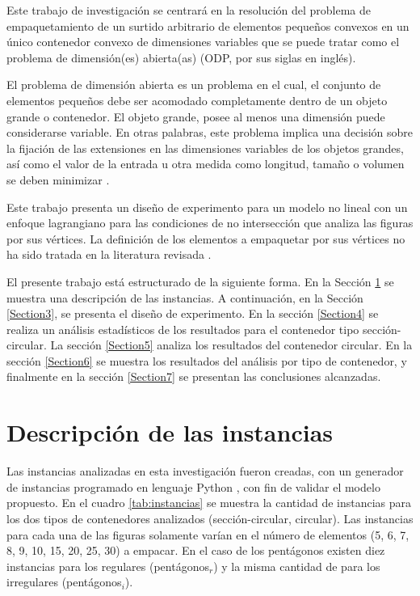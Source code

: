 \documentclass[5p,times]{elsarticle}
\begin{document}
   Este trabajo de investigación se centrará en la resolución del problema de empaquetamiento de un surtido arbitrario de elementos pequeños convexos en un único contenedor convexo de dimensiones variables que se puede tratar como el problema de dimensión(es) abierta(as) (ODP, por sus siglas en inglés).

   El problema de dimensión abierta es un problema en el cual, el conjunto de elementos pequeños debe ser acomodado completamente dentro de un objeto grande o contenedor. El objeto grande, posee al menos una dimensión puede considerarse variable. En otras palabras, este problema implica una decisión sobre la fijación de las extensiones en las dimensiones variables de los objetos grandes, así como el valor de la entrada u otra medida como longitud, tamaño o volumen se deben minimizar \cite{WASCHER2007}.
   
   Este trabajo presenta un diseño de experimento para un modelo no lineal con un enfoque lagrangiano para las condiciones de no intersección que analiza las figuras por sus vértices. La definición de los elementos a empaquetar por sus vértices no ha sido tratada en la literatura revisada \cite{litvinchevlagrangian}. 

	
	El presente trabajo está estructurado de la siguiente forma. En la Sección \ref{Section2} se muestra una descripción de las instancias. A continuación, en la Sección \ref{Section3}, se presenta el diseño de experimento. En la sección \ref{Section4} se realiza un análisis estadísticos de los resultados para el contenedor tipo sección-circular. La sección \ref{Section5} analiza los resultados del contenedor circular. En la sección \ref{Section6} se muestra los resultados del análisis por tipo de contenedor, y finalmente en la sección \ref{Section7} se presentan las conclusiones alcanzadas.
	
\section{Descripción de las instancias}\label{Section2}
	
	Las instancias analizadas en esta investigación fueron creadas, con un generador de instancias programado en lenguaje Python \cite{Phy}, con fin de validar el modelo propuesto. En el cuadro \ref{tab:instancias} se muestra la cantidad de instancias para los dos tipos de contenedores analizados (sección-circular, circular). Las instancias para cada una de las figuras solamente varían en el número de elementos (5, 6, 7, 8, 9, 10, 15, 20, 25, 30) a empacar. En el caso de los pentágonos existen diez instancias para los regulares (pentágonos$_r$) y la misma cantidad de para los irregulares (pentágonos$_i$).   
	 
\end{document}

